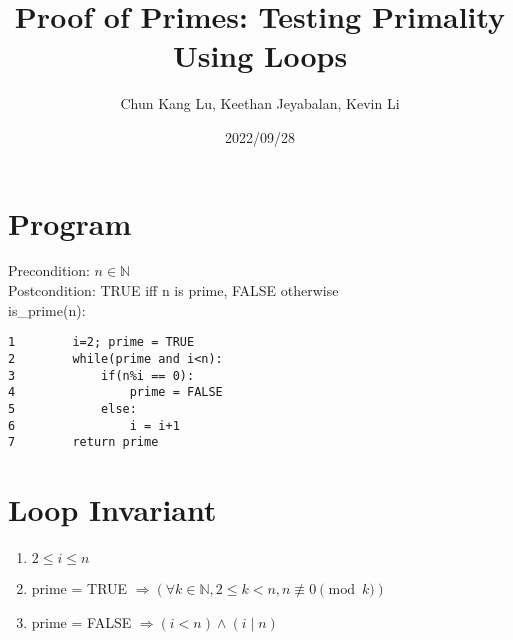 \documentclass{article}
\title{Proof of Primes: Testing Primality Using Loops}
\author{Chun Kang Lu, Keethan Jeyabalan, Kevin Li}
\date{2022/09/28}
\begin{document}
	\maketitle
	\flushleft
	\section*{Program}
	Precondition: \(n\in \mathbb{N} \) \\ 
	Postcondition: TRUE iff n is prime, FALSE otherwise\\
	is\_prime(n): \\
	\begin{verbatim}
1        i=2; prime = TRUE
2        while(prime and i<n):
3            if(n%i == 0):
4                prime = FALSE
5            else:
6                i = i+1
7        return prime
	\end{verbatim}
	\section*{Loop Invariant}
	\begin{enumerate}[label=(\alph*)]
		\item \(2 \leq i \leq n\)
		\item prime = TRUE \(\Longrightarrow(\forall k \in \mathbb{N}, 2 \leq k < n, n \not\equiv 0 \pmod k)\)
		\item prime = FALSE \(\Longrightarrow (i < n) \land (i\mid n)\)
	\end{enumerate}
\end{document}

